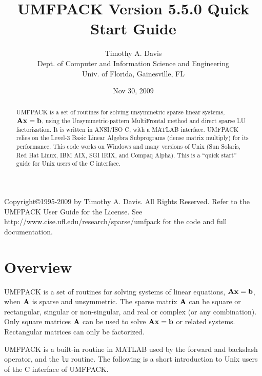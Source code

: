 \documentclass[11pt]{article}
\newcommand{\m}[1]{{\bf{#1}}}       %
\begin{document}
\author{Timothy A. Davis \\
Dept. of Computer and Information Science and Engineering \\
Univ. of Florida, Gainesville, FL}
\title{UMFPACK Version 5.5.0 Quick Start Guide}
\date{Nov 30, 2009}
\maketitle

\begin{abstract}
    UMFPACK is a set of routines for solving unsymmetric sparse linear
    systems, $\m{Ax}=\m{b}$, using the Unsymmetric-pattern MultiFrontal method
    and direct sparse LU factorization.  It is written in ANSI/ISO C, with a
    MATLAB interface.  UMFPACK relies on the Level-3
    Basic Linear Algebra Subprograms (dense matrix multiply) for its
    performance.  This code works on Windows and many versions of Unix (Sun
    Solaris, Red Hat Linux, IBM AIX, SGI IRIX, and Compaq Alpha).
    This is a ``quick start'' guide for Unix users of the C interface.
\end{abstract}

Copyright\copyright 1995-2009 by Timothy A. Davis.
All Rights Reserved.  Refer to the UMFPACK User Guide
for the License. See \newline
http://www.cise.ufl.edu/research/sparse/umfpack
for the code and full documentation.

\section{Overview}

UMFPACK is a set of routines for solving systems of linear
equations, $\m{Ax}=\m{b}$, when $\m{A}$ is sparse and unsymmetric.
The sparse matrix $\m{A}$ can be square or rectangular, singular
or non-singular, and real or complex (or any combination).  Only square
matrices $\m{A}$ can be used to solve $\m{Ax}=\m{b}$ or related systems.
Rectangular matrices can only be factorized.

UMFPACK is a built-in routine in MATLAB used by the forward and
backslash operator, and the {\tt lu} routine.
The following is a short
introduction to Unix users of the C interface of UMFPACK.
\end{document}
